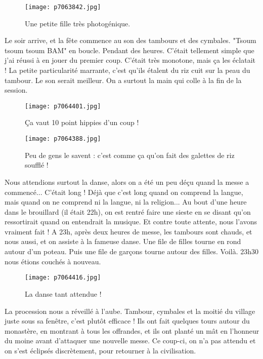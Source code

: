 \documentclass{book}
\begin{document}
\begin{figure}[h]
\centering
\texttt{[image: p7063842.jpg]}
\caption*{Une petite fille très photogénique.}
\end{figure}

Le soir arrive, et la fête commence au son des tambours et des cymbales. "Tsoum tsoum tsoum BAM" en boucle. Pendant des heures. C'était tellement simple que j'ai réussi à en jouer du premier coup. C'était très monotone, mais ça les éclatait ! La petite particularité marrante, c'est qu'ils étalent du riz cuit sur la peau du tambour. Le son serait meilleur. On a surtout la main qui colle à la fin de la session.


\begin{figure}[h]
\centering
\texttt{[image: p7064401.jpg]}
\caption*{Ça vaut 10 point hippies d'un coup !}
\end{figure}


\begin{figure}[h]
\centering
\texttt{[image: p7064388.jpg]}
\caption*{Peu de gens le savent : c'est comme ça qu'on fait des galettes de riz soufflé !}
\end{figure}

Nous attendions surtout la danse, alors on a été un peu déçu quand la messe a commencé... C'était long ! Déjà que c'est long quand on comprend la langue, mais quand on ne comprend ni la langue, ni la religion... Au bout d'une heure dans le brouillard (il était 22h), on est rentré faire une sieste en se disant qu'on ressortirait quand on entendrait la musique. Et contre toute attente, nous l'avons vraiment fait ! A 23h, après deux heures de messe, les tambours sont chauds, et nous aussi, et on assiste à la fameuse danse. Une file de filles tourne en rond autour d'un poteau. Puis une file de garçons tourne autour des filles. Voilà. 23h30 nous étions couchés à nouveau.


\begin{figure}[h]
\centering
\texttt{[image: p7064416.jpg]}
\caption*{La danse tant attendue !}
\end{figure}

La procession nous a réveillé à l'aube. Tambour, cymbales et la moitié du village juste sous sa fenêtre, c'est plutôt efficace ! Ils ont fait quelques tours autour du monastère, en montrant à tous les offrandes, et ils ont planté un mât en l'honneur du moine avant d'attaquer une nouvelle messe. Ce coup-ci, on n'a pas attendu et on s'est éclipsés discrètement, pour retourner à la civilisation.
\end{document}
